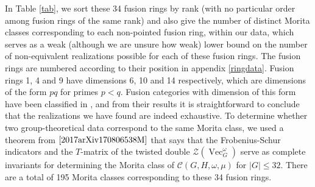 \documentclass[a4paper, 10pt]{book}
\theoremstyle{definition}
\numberwithin{equation}{chapter}
\newcommand\Vect{\operatorname{Vec}}
\newcommand\C{\mathcal C}
\newcommand\CTR{\mathcal Z}
\begin{document}
In Table \ref{tab}, we sort these 34 fusion rings by rank (with no particular order among fusion rings of the same rank) and also give the number of distinct Morita classes corresponding to each non-pointed fusion ring, within our data, which serves as a weak (although we are unsure how weak) lower bound on the number of non-equivalent realizations possible for each of these fusion rings. The fusion rings are numbered according to their position in appendix \ref{ringdata}. Fusion rings 1, 4 and 9 have dimensions 6, 10 and 14 respectively, which are dimensions of the form $pq$ for primes $p<q$. Fusion categories with dimension of this form have been classified in \cite{MR2098028}, and from their results it is straightforward to conclude that the realizations we have found are indeed exhaustive. To determine whether two group-theoretical data correspond to the same Morita class, we used a theorem from $\cite{2017arXiv170806538M}$ that says that the Frobenius-Schur indicators and the $T$-matrix of the twisted double $\CTR(\Vect^\omega_G)$ serve as complete invariants for determining the Morita class of $\C(G, H, \omega, \mu)$ for $|G|\leq 32$. There are a total of 195 Morita classes corresponding to these 34 fusion rings. \\
\end{document}
